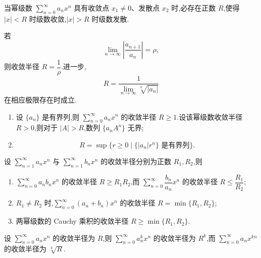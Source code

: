 \documentclass[../数学分析培优讲义.tex]{subfiles}
\begin{document}
\begin{corollary}[\markstar]
当幂级数 $\displaystyle\sum\limits_{n=0}^{\infty}a_nx^n$ 具有收敛点 $x_1\neq0$、发散点 $x_2$ 时,必存在正数 $R$,使得 $|x|<R$ 时级数收敛,$|x|>R$ 时级数发散.
\end{corollary}

\begin{theorem}[\markstar]
若
\[
    \lim\limits_{n\to\infty}\left|\dfrac{a_{n+1}}{a_n}\right|=\rho,
\]
则收敛半径 $R=\dfrac{1}{\rho}$.进一步,
\[
    R=\dfrac{1}{\displaystyle\lim\limits_{n\to\infty}\sqrt[n]{|a_n|}}
\]
在相应极限存在时成立.
\end{theorem}

\begin{proposition}[\markstar]
\begin{enumerate}[label=(\arabic*)]
    \item 设 $\{a_n\}$ 是有界列,则 $\displaystyle\sum\limits_{n=0}^{\infty}a_nx^n$ 的收敛半径 $R\geq1$.设该幂级数收敛半径 $R>0$,则对于 $|A|>R$,数列 $\{a_nA^n\}$ 无界;
    \item
    \[
        R=\sup\{r\geq0\mid \{|a_n|r^n\}\text{ 是有界列}\}.
    \]
\end{enumerate}
\end{proposition}

\begin{proposition}[\markstar]
设 $\displaystyle\sum\limits_{n=1}^{\infty}a_nx^n$ 与 $\displaystyle\sum\limits_{n=1}^{\infty}b_nx^n$ 的收敛半径分别为正数 $R_1,R_2$,则
\begin{enumerate}[label=(\arabic*)]
    \item $\displaystyle\sum\limits_{n=0}^{\infty}a_nb_nx^n$ 的收敛半径 $R\geq R_1R_2$,而 $\displaystyle\sum\limits_{n=0}^{\infty}\dfrac{b_n}{a_n}x^n$ 的收敛半径 $R\leq\dfrac{R_1}{R_2}$;
    \item $R_1\neq R_2$ 时,$\displaystyle\sum\limits_{n=0}^{\infty}(a_n+b_n)x^n$ 的收敛半径 $R=\min\{R_1,R_2\}$;
    \item 两幂级数的 Cauchy 乘积的收敛半径 $R\geq\min\{R_1,R_2\}$.
\end{enumerate}
\end{proposition}

\begin{proposition}[\markstar]
设 $\displaystyle\sum\limits_{n=0}^{\infty}a_nx^n$ 的收敛半径为 $R$,则 $\displaystyle\sum\limits_{n=0}^{\infty}a_n^kx^n$ 的收敛半径为 $R^k$,而 $\displaystyle\sum\limits_{n=0}^{\infty}a_nx^{kn}$ 的收敛半径为 $\sqrt[k]{R}$.
\end{proposition}
\end{document}
